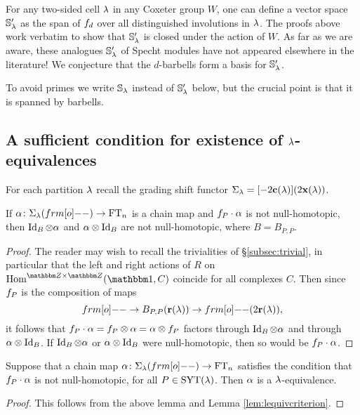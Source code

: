 \begin{remark}
For any two-sided cell $\lambda$ in any Coxeter group $W$, one can define a vector space ${\mathbb{S}}_\lambda'$ as the span of $f_{d}$ over all distinguished involutions in $\lambda$. The proofs above work verbatim to show that ${\mathbb{S}}_\lambda'$ is closed under the action of $W$.  As far as we are aware, these analogues ${\mathbb{S}}_\lambda'$ of Specht modules have not appeared elsewhere in the literature! We conjecture that the $d$-barbells form a basis for ${\mathbb{S}}_\lambda'$.
\end{remark}

To avoid primes we write ${\mathbb{S}}_\lambda$ instead of ${\mathbb{S}}_\lambda'$ below, but the crucial point is that it is spanned by barbells.


\subsection{A sufficient condition for existence of $\lambda$-equivalences}
\label{subsec:lambdaEquivsufficient}


For each partition $\lambda$ recall the grading shift functor $\Sigma_\lambda=[-2\mathbf{c}(\lambda)](2\mathbf{x}(\lambda))$.

\begin{lemma} If $\a\co\shift{\l}{\one}\to \FT_n$ is a chain map and $f_{P} \cdot \alpha$ is not null-homotopic, then $\operatorname{Id}_B \otimes \alpha$ and $\alpha \otimes \operatorname{Id}_B$ are not null-homotopic, where $B = B_{P,P}$. \end{lemma}

\begin{proof}  The reader may wish to recall the trivialities of \S\ref{subsec:trivial}, in particular that the left and right actions of $R$ on $\Hom^{\Z\times \Z}(\one,C)$ coincide for all complexes $C$.   Then since $f_{P}$ is the composition of maps
\[
\one\to B_{P,P}(\rbb(\l)) \to \one(2\rbb(\l)),
\]
it follows that $f_{P} \cdot \alpha=f_{P}\otimes \alpha = \alpha\otimes f_{P}$ factors through $\operatorname{Id}_B \otimes \alpha$ and through $\alpha \otimes \operatorname{Id}_B$.   If $\operatorname{Id}_B\otimes \alpha$ or $\alpha\otimes \operatorname{Id}_B$ were null-homotopic, then so would be $f_{P}\cdot \alpha$.\end{proof}
	
\begin{cor} Suppose that a chain map $\a\co\shift{\l}{\one}\to \FT_n$ satisfies the condition that $f_{P} \cdot \alpha$ is not null-homotopic, for all $P \in \operatorname{SYT}(\lambda)$. Then $\alpha$ is a
$\lambda$-equivalence. \end{cor}

\begin{proof} This follows from the above lemma and Lemma \ref{lem:lequivcriterion}.\end{proof}

